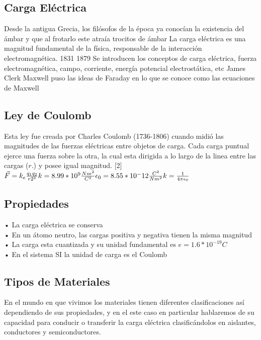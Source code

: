 \documentclass[spanish,10pt,a4paper,onecolumn]{article}
\begin{document}
\subsection{Carga Eléctrica}
Desde la antigua Grecia, los filósofos de la época ya conocían la existencia del ámbar y que al frotarlo este atraía trocitos de ámbar
La carga eléctrica es una magnitud fundamental de la física, responsable de la interacción electromagnética.
1831
1879 Se introducen los conceptos de carga eléctrica, fuerza
electromagnética, campo, corriente, energía potencial electrostática, etc
James Clerk Maxwell puso las ideas de Faraday en lo que se conoce como
las ecuaciones de Maxwell

\subsection{Ley de Coulomb}
Esta ley fue creada por Charles Coulomb (1736-1806) cuando midió las magnitudes de las fuerzas eléctricas entre objetos de carga. Cada carga puntual ejerce una fuerza sobre la otra, la cual esta dirigida a lo largo de la linea entre las cargas ($r.$) y posee igual magnitud. [2]\\
\begin{math}
	\vec{F} = k_{e} \frac{q_{1}q_{2}}{r{2^2}} \\  
	k = 8.99*10^9 \frac{Nm^2}{C^2} \\
	\epsilon_{0} = 8.55*10^-12 \frac{C^2}{Nm^2} \\
	k = \frac{1}{4 \pi \epsilon_{0}} \\
\end{math}

\subsection{Propiedades}
• La carga eléctrica se conserva \\
• En un átomo neutro, las cargas 
positiva y negativa tienen la misma
magnitud \\
• La carga esta cuantizada y su
unidad fundamental es
$e = 1.6*10^{-19}C$ \\
• En el sistema SI la unidad de
carga es el Coulomb \\
\subsection{Tipos de Materiales}
En el mundo en que vivimos los materiales tienen diferentes clasificaciones así dependiendo de sus propiedades, y en el este caso en particular hablaremos de su capacidad para conducir o transferir la carga eléctrica clasificándolos en aislantes, conductores y semiconductores. 
\end{document}
